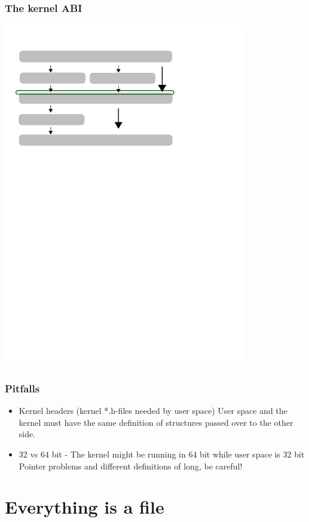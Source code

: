 \documentclass{beamer}
\begin{document}
\begin{frame}
\frametitle{The kernel ABI}
\begin{center}
	\includegraphics[width=0.8\textwidth]{kernel}
\end{center}
\end{frame}

\begin{frame}
\frametitle{Pitfalls}
\begin{itemize}
	\item Kernel headers (kernel *.h-files needed by user space)
User space and the kernel must have the same definition of structures passed over to the other side.\\
	\item 32 vs 64 bit - The kernel might be running in 64 bit while user space is 32 bit
Pointer problems and different definitions of long, be careful!
\end{itemize}
\end{frame}

\section{Everything is a file}
\end{document}
